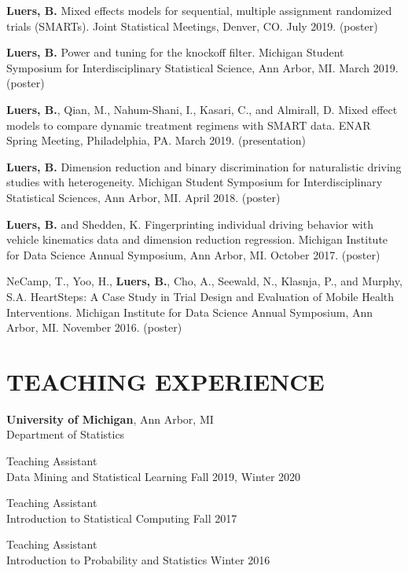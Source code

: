 \documentclass[letterpaper, 11pt]{article}
\begin{document}
\textbf{Luers, B.} Mixed effects models for sequential, multiple assignment randomized trials (SMARTs).
Joint Statistical Meetings, Denver, CO. July 2019. (poster)

\textbf{Luers, B.} Power and tuning for the knockoff filter. 
Michigan Student Symposium for Interdisciplinary Statistical Science,
Ann Arbor, MI. March 2019. (poster)

\textbf{Luers, B.}, Qian, M., Nahum-Shani, I., Kasari, C., and Almirall, D. 
Mixed effect models to compare dynamic treatment regimens with SMART data. 
ENAR Spring Meeting, Philadelphia, PA. March 2019. (presentation)

\textbf{Luers, B.} Dimension reduction and binary discrimination for naturalistic driving studies with heterogeneity. 
Michigan Student Symposium for Interdisciplinary Statistical Sciences, Ann Arbor, MI. April 2018. (poster)

\textbf{Luers, B.} and Shedden, K. Fingerprinting individual driving behavior with vehicle kinematics data and dimension reduction regression. Michigan Institute for Data Science Annual Symposium, Ann Arbor, MI. October 2017. (poster)

NeCamp, T., Yoo, H., \textbf{Luers, B.}, Cho, A., Seewald, N., Klasnja, P., and Murphy, S.A. HeartSteps: A Case Study in Trial Design and Evaluation of Mobile Health Interventions. Michigan Institute for Data Science Annual Symposium, Ann Arbor, MI. November 2016. (poster)


\section{TEACHING EXPERIENCE}
{\bf University of Michigan}, Ann Arbor, MI \\
Department of Statistics

\hspace{15pt}Teaching Assistant\\
\hspace{15pt}%
Data Mining and Statistical Learning \hfill Fall 2019, Winter 2020

\hspace{15pt}Teaching Assistant\\
\hspace{15pt}%
Introduction to Statistical Computing \hfill Fall 2017

\hspace{15pt}Teaching Assistant\\
\hspace{15pt}%
Introduction to Probability and Statistics \hfill Winter 2016
\end{document}
